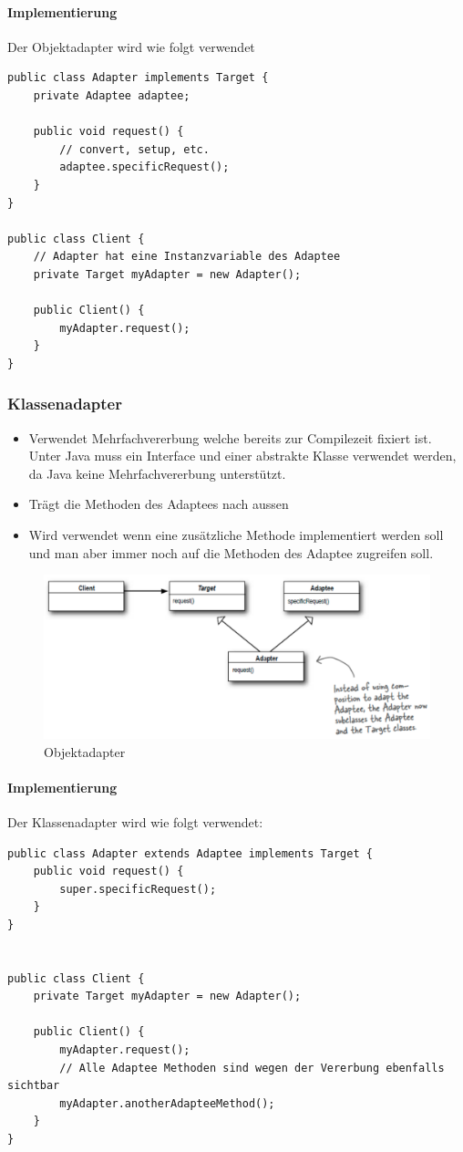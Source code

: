 \paragraph{Implementierung}
Der Objektadapter wird wie folgt verwendet
\begin{lstlisting}
public class Adapter implements Target {
	private Adaptee adaptee;
	
	public void request() {
		// convert, setup, etc.
		adaptee.specificRequest();
	}
}

public class Client {
	// Adapter hat eine Instanzvariable des Adaptee
	private Target myAdapter = new Adapter();
	
	public Client() {
		myAdapter.request();
	}
}
\end{lstlisting}


\clearpage

\subsubsection{Klassenadapter}
\begin{itemize}
	\item Verwendet Mehrfachvererbung welche bereits zur Compilezeit fixiert ist. Unter Java muss ein Interface und einer abstrakte Klasse verwendet werden, da Java keine Mehrfachvererbung unterstützt.
	\item Trägt die Methoden des Adaptees nach aussen
	\item Wird verwendet wenn eine zusätzliche Methode implementiert werden soll und man aber immer noch auf die  Methoden des Adaptee zugreifen soll.
\end{itemize}

\begin{figure}[h]
	\centering
	\includegraphics[width=0.7\linewidth]{images/adapter_class_pattern}
	\caption{Objektadapter}
	\label{fig:adapterpattern}
\end{figure}

\paragraph{Implementierung}
Der Klassenadapter wird wie folgt verwendet: 
\begin{lstlisting}
public class Adapter extends Adaptee implements Target {
	public void request() {
		super.specificRequest();
	}
}


public class Client {
	private Target myAdapter = new Adapter();
	
	public Client() {
		myAdapter.request();
		// Alle Adaptee Methoden sind wegen der Vererbung ebenfalls sichtbar
		myAdapter.anotherAdapteeMethod();
	}
}
\end{lstlisting}

